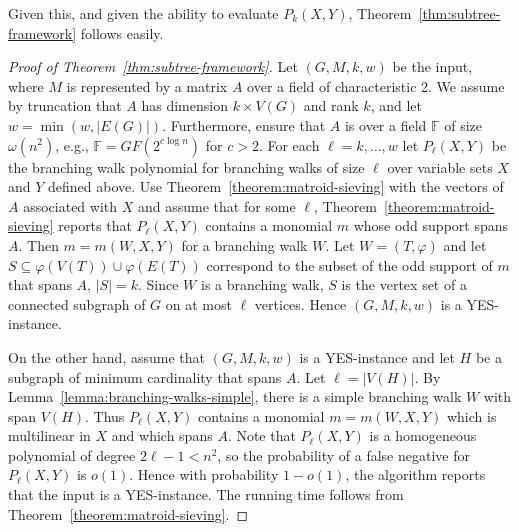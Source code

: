 \documentclass[10pt,a4paper]{article}
\newcommand{\F}{\ensuremath{\mathbb F}\xspace}
\begin{document}
Given this, and given the ability to evaluate $P_k(X,Y)$,
Theorem~\ref{thm:subtree-framework} follows easily.

\begin{proof}[Proof of Theorem~\ref{thm:subtree-framework}]
  Let $(G, M, k, w)$ be the input, where $M$ is represented by a
  matrix $A$ over a field of characteristic 2. We assume by truncation
  that $A$ has dimension $k \times V(G)$ and rank $k$,
  and let $w=\min(w,|E(G)|)$. 
  Furthermore, ensure that $A$ is over a field $\F$ of size
  $\omega(n^2)$, e.g., $\F=GF(2^{c \log n})$ for $c > 2$.
  For each $\ell=k, \ldots, w$ let $P_\ell(X,Y)$ be the branching walk
  polynomial for branching walks of size $\ell$ over variable sets $X$ and $Y$
  defined above. Use Theorem~\ref{theorem:matroid-sieving}
  with the vectors of $A$ associated with $X$ 
  and assume that for some $\ell$, Theorem~\ref{theorem:matroid-sieving} reports that $P_\ell(X,Y)$
  contains a monomial $m$ whose odd support spans $A$.
  Then $m=m(W,X,Y)$ for a branching walk $W$. Let $W=(T,\varphi)$
  and let $S \subseteq \varphi(V(T)) \cup \varphi(E(T))$ correspond 
  to the subset of the odd support of $m$ that spans $A$, $|S|=k$. 
  Since $W$ is a branching walk, $S$ is the vertex set 
  of a connected subgraph of $G$ on at most $\ell$ vertices. 
  Hence $(G,M,k,w)$ is a YES-instance.

  On the other hand, assume that $(G,M,k,w)$ is a YES-instance
  and let $H$ be a subgraph of minimum cardinality that spans $A$.
  Let $\ell=|V(H)|$. 
  By Lemma~\ref{lemma:branching-walks-simple}, 
  there is a simple branching walk $W$ with span $V(H)$.
  Thus $P_\ell(X,Y)$ contains a monomial $m=m(W,X,Y)$ which is multilinear in $X$
  and which spans $A$. 
  Note that $P_\ell(X,Y)$ is a homogeneous polynomial of degree
  $2\ell - 1 < n^2$, so the probability of a false negative for
  $P_\ell(X,Y)$ is $o(1)$.
  Hence with probability $1-o(1)$, the algorithm reports that the
  input is a YES-instance.
  The running time follows from Theorem~\ref{theorem:matroid-sieving}.


\end{proof}
\end{document}
